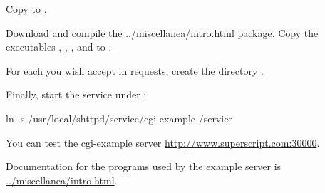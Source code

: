 Copy  to
.

Download and compile the \href{miscellanea}{../miscellanea/intro.html}
package.  Copy the executables , ,
, and  to
.

For each  you wish accept in requests, create the
directory
.

Finally, start the service under :
\begin{code}
  ln -s /usr/local/shttpd/service/cgi-example /service
\end{code}

You can test the cgi-example server
\href{here}{http://www.superscript.com:30000}.

Documentation for the programs used by the example server is
\href{here}{../miscellanea/intro.html}.


